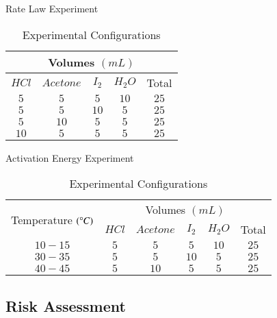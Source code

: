 \begin{table}[!htb]
    \begin{minipage}{.5\linewidth}
      \caption{Rate Law Experiment}
      \centering
		\begin{tabular}{|c|c|c|c|c|} 
		 \hline
		 \multicolumn{5}{|c|}{Volumes $(mL)$} \\
		 \hline
		$HCl$ & $Acetone$ & $I_2$ & $H_2O$ & Total \\
		  \hline
		  $5$ & $5$ & $5$ & $10$ & $25$ \\
		  \hline
		  $5$ & $5$ & $10$ & $5$ & $25$ \\
		  \hline
		  $5$ & $10$ & $5$ & $5$ & $25$ \\
		  \hline
		  $10$ & $5$ & $5$ & $5$ & $25$ \\
		  \hline
		\end{tabular}
		\label{table:1_config}
    \end{minipage}%
    \begin{minipage}{.5\linewidth}
      \centering
        \caption{Activation Energy Experiment}
		\begin{tabular}{|c|c|c|c|c|c|} 
		 \hline
		  \multirow{2}{*}{Temperature $(\degree C)$} & \multicolumn{5}{|c|}{Volumes $(mL)$} \\
		  	\cline{2-6}
		 	& $HCl$ & $Acetone$ & $I_2$ & $H_2O$ & Total \\
		  \hline
		  $10-15$ & $5$ & $5$ & $5$ & $10$ & $25$ \\
		  \hline
		  $30-35$ & $5$ & $5$ & $10$ & $5$ & $25$ \\
		  \hline
		  $40-45$ & $5$ & $10$ & $5$ & $5$ & $25$ \\
		  \hline
		\end{tabular}
		\label{table:2_config}
    \end{minipage}
    \caption{Experimental Configurations}
    \label{table:config}
\end{table}

\subsection{Risk Assessment}


